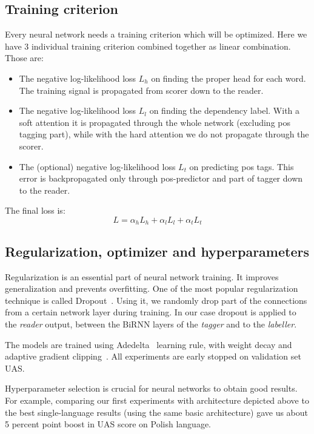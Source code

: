 \subsection{Training criterion}
Every neural network needs a training criterion which will be optimized.
Here we have 3 individual training criterion combined together as linear
combination. Those are:
\begin{itemize}
        \item The negative log-likelihood loss $L_h$ on finding the proper head for each
            word. The training signal is propagated from scorer down to the reader.
        \item The negative log-likelihood loss $L_l$ on finding the dependency label.
            With a soft attention it is propagated through the whole network (excluding
            pos tagging part), while with the hard attention we do not propagate
            through the scorer.
        \item The (optional) negative log-likelihood loss $L_t$ on predicting pos tags.
            This error is backpropagated only through pos-predictor and part of tagger
            down to the reader.
\end{itemize}
The final loss is:
\begin{equation}\label{eq:neural_loss}
    L = \alpha_hL_h + \alpha_lL_l + \alpha_tL_t
\end{equation}

\subsection{Regularization, optimizer and hyperparameters} \label{sec:basic_params}
Regularization is an essential part of  neural network training. It improves 
generalization and prevents overfitting. One of the most popular regularization
technique is called Dropout~\cite{srivastava_dropout:_2014}. Using it, we randomly
drop part of the connections from a certain network layer during training.
In our case dropout is applied to the \emph{reader} output, between the BiRNN
layers of the \emph{tagger} and to the \emph{labeller}.

The models are trained using Adedelta~\cite{zeiler_adadelta:_2012} learning rule,
with weight decay and adaptive gradient clipping~\cite{chorowski_end--end_2014}.
All experiments are early stopped on validation set UAS.

Hyperparameter selection is crucial for neural networks to obtain good results.
For example, comparing our first experiments with architecture depicted above to
the best single-language results (using the same basic architecture) gave us
about 5 percent point boost in UAS score on Polish language.

